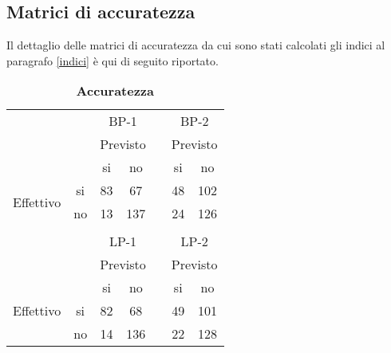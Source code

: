 \documentclass[9pt,twocolumn,twoside]{osajnl}
\begin{document}
\subsection{Matrici di accuratezza}
\label{matrici}

Il dettaglio delle matrici di accuratezza da cui sono stati calcolati gli indici al paragrafo \ref{indici} è qui di seguito riportato.

%
\begin{table}[htbp]
\centering
\begin{tabular}{cccclcc}
                           &                         & \multicolumn{2}{c}{BP-1}                           &                       & \multicolumn{2}{c}{BP-2}                           \\
                           &                         & \multicolumn{2}{c}{Previsto}                       &                       & \multicolumn{2}{c}{Previsto}                       \\
                           &                         & si                      & no                       &                       & si                      & no                       \\ \cline{3-4} \cline{6-7} 
\multirow{2}{*}{Effettivo} & \multicolumn{1}{c|}{si} & \multicolumn{1}{c|}{83} & \multicolumn{1}{c|}{67} & \multicolumn{1}{l|}{} & \multicolumn{1}{c|}{48} & \multicolumn{1}{c|}{102} \\ \cline{3-4} \cline{6-7} 
                           & \multicolumn{1}{c|}{no} & \multicolumn{1}{c|}{13} & \multicolumn{1}{c|}{137} & \multicolumn{1}{l|}{} & \multicolumn{1}{c|}{24} & \multicolumn{1}{c|}{126} \\ \cline{3-4} \cline{6-7} 
                           &                         &                         &                          &                       &                         &                          \\
                           &                         & \multicolumn{2}{c}{LP-1}                           &                       & \multicolumn{2}{c}{LP-2}                           \\
                           &                         & \multicolumn{2}{c}{Previsto}                       &                       & \multicolumn{2}{c}{Previsto}                       \\
                           &                         & si                      & no                       &                       & si                      & no                       \\ \cline{3-4} \cline{6-7} 
Effettivo                  & \multicolumn{1}{c|}{si} & \multicolumn{1}{c|}{82} & \multicolumn{1}{c|}{68} & \multicolumn{1}{l|}{} & \multicolumn{1}{c|}{49} & \multicolumn{1}{c|}{101} \\ \cline{3-4} \cline{6-7} 
                           & \multicolumn{1}{c|}{no} & \multicolumn{1}{c|}{14} & \multicolumn{1}{c|}{136} & \multicolumn{1}{l|}{} & \multicolumn{1}{c|}{22} & \multicolumn{1}{c|}{128} \\ \cline{3-4} \cline{6-7} 
\end{tabular}
\caption{\bf Accuratezza}
\label{tab:matrici}
\end{table}
\end{document}
